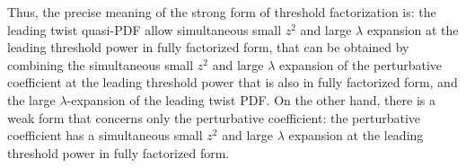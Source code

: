 \documentclass[a4paper,11pt]{article}
\begin{document}
Thus, the precise meaning of the {\color{red} strong form} of threshold factorization is: {\color{red} the leading twist quasi-PDF allow simultaneous small $z^2$ and large $\lambda$ expansion at the leading threshold power in fully factorized form, that can be obtained by combining the  simultaneous  small $z^2$ and large $\lambda$ expansion of the perturbative coefficient at the leading threshold power that is also in fully factorized form, and the large $\lambda$-expansion of the leading twist PDF.}  On the other hand, there is a {\color{red} weak form} that concerns only the perturbative coefficient: {\color{red} the perturbative coefficient has a simultaneous small $z^2$ and large $\lambda$ expansion at the leading threshold power in fully factorized form. }
\fi



\end{document}
